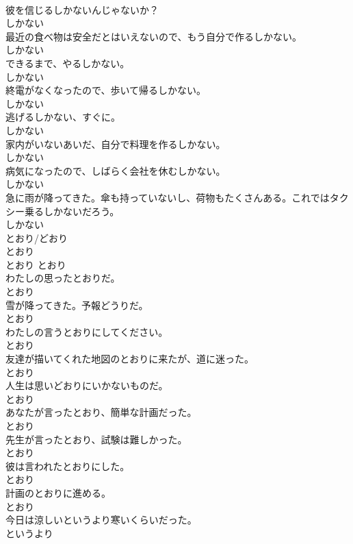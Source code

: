 \documentclass[8pt]{extreport}
\begin{document}
\begin{CJK}{UTF8}{min}
\\	彼を信じるしかないんじゃないか？	
\\	しかない
\\	最近の食べ物は安全だとはいえないので、もう自分で作るしかない。	
\\	しかない
\\	できるまで、やるしかない。	
\\	しかない
\\	終電がなくなったので、歩いて帰るしかない。	
\\	しかない
\\	逃げるしかない、すぐに。	
\\	しかない
\\	家内がいないあいだ、自分で料理を作るしかない。	
\\	しかない
\\	病気になったので、しばらく会社を休むしかない。	
\\	しかない
\\	急に雨が降ってきた。傘も持っていないし、荷物もたくさんある。これではタクシー乗るしかないだろう。	
\\	しかない
\\	とおり/どおり	
\\	とおり	
\\	とおり	とおり
\\	わたしの思ったとおりだ。	
\\	とおり
\\	雪が降ってきた。予報どうりだ。	
\\	とおり
\\	わたしの言うとおりにしてください。	
\\	とおり
\\	友達が描いてくれた地図のとおりに来たが、道に迷った。	
\\	とおり
\\	人生は思いどおりにいかないものだ。	
\\	とおり
\\	あなたが言ったとおり、簡単な計画だった。	
\\	とおり
\\	先生が言ったとおり、試験は難しかった。	
\\	とおり
\\	彼は言われたとおりにした。	
\\	とおり
\\	計画のとおりに進める。	
\\	とおり
\\	今日は涼しいというより寒いくらいだった。	
\\	というより

\end{CJK}
\end{document}
